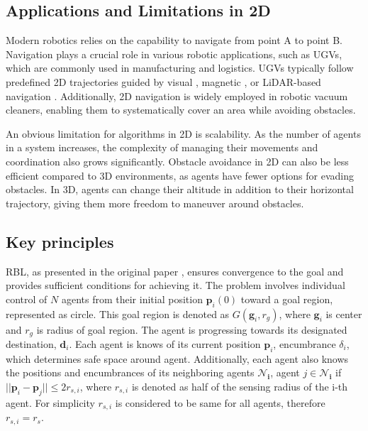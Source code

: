     \subsection{Applications and Limitations in 2D}
        Modern robotics relies on the capability to navigate from point A to point B.
        Navigation plays a crucial role in various robotic applications, such as \ac{UGV}s, which are commonly used in manufacturing and logistics. 
        \ac{UGV}s typically follow predefined 2D trajectories guided by visual \cite{vision_navigation}, magnetic \cite{magnetic_navigation}, or LiDAR-based navigation \cite{lidar_navigation}. 
        Additionally, 2D navigation is widely employed in robotic vacuum cleaners, enabling them to systematically cover an area while avoiding obstacles.

        An obvious limitation for algorithms in 2D is scalability. 
        As the number of agents in a system increases, the complexity of managing their movements and coordination also grows significantly.
        Obstacle avoidance in 2D can also be less efficient compared to 3D environments, as agents have fewer options for evading obstacles. 
        In 3D, agents can change their altitude in addition to their horizontal trajectory, giving them more freedom to maneuver around obstacles.

    \subsection{Key principles}
        RBL, as presented in the original paper \cite{rbl_paper}, ensures convergence to the goal and provides sufficient conditions for achieving it. 
        The problem involves individual control of $N$ agents from their initial position $\mathbf{p}_i(0)$ toward a goal region, represented as circle.
        This goal region is denoted as $G(\mathbf{g}_i, r_g)$, where $\mathbf{g}_i$ is center and $r_g$ is radius of goal region. 
        The agent is progressing towards its designated destination, $\mathbf{d}_i$.
        Each agent is knows of its current position $\mathbf{p}_i$, encumbrance $\delta_i$, which determines safe space around agent.
        Additionally, each agent also knows the positions and encumbrances of its neighboring agents $\mathbf{\mathcal{N}_i}$, agent $j \in \mathbf{\mathcal{N}_i}$ if $||\mathbf{p}_i - \mathbf{p}_j|| \leq 2r_{s,i}$, where $r_{s,i}$ is denoted as half of the sensing radius of the i-th agent.
        For simplicity $r_{s,i}$ is considered to be same for all agents, therefore $r_{s,i} = r_s$. 

